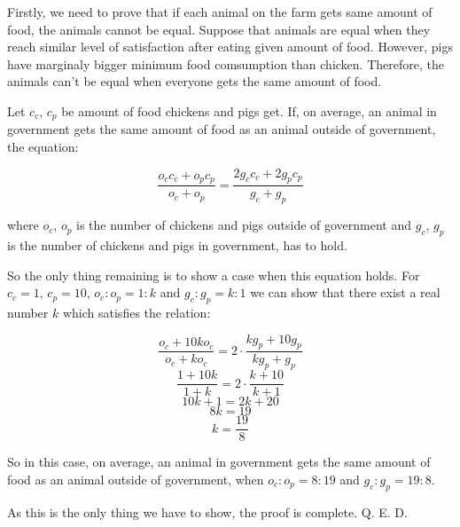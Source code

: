 \documentclass{fkssolpub}
\author{Ondřej Sedláček}
\begin{document}
Firstly, we need to prove that if each animal on the farm gets same
amount of food, the animals cannot be equal. Suppose that animals are
equal when they reach similar level of satisfaction after eating given
amount of food. However, pigs have marginaly bigger minimum food comsumption
than chicken. Therefore, the animals can't be equal when everyone gets the
same amount of food.

Let $c_c$, $c_p$ be amount of food chickens and pigs get. If, on average,
an animal in government gets the same amount of food as an animal outside
of government, the equation:

\[
	\frac{o_c c_c + o_p c_p}{o_c + o_p} = \frac{2 g_c c_c + 2 g_p c_p}{g_c + g_p}
\]

where $o_c$, $o_p$ is the number of chickens and pigs outside of government and
$g_c$, $g_p$ is the number of chickens and pigs in government, has to hold.

So the only thing remaining is to show a case when this equation holds. For
$c_c = 1$, $c_p = 10$, $o_c : o_p = 1 : k$ and $g_c : g_p = k : 1$ we can
show that there exist a real number $k$ which satisfies the relation:

\[
	\frac{o_c + 10 k o_c}{o_c + k o_c} = 2 \cdot \frac{k g_p + 10 g_p}{k g_p + g_p}
\]
\[
	\frac{1 + 10 k}{1 + k} = 2 \cdot \frac{k + 10}{k + 1}
\]
\[
	10k + 1 = 2k + 20
\]
\[
	8k = 19
\]
\[
	k = \frac{19}{8}
\]

So in this case, on average, an animal in government gets the same amount of food as
an animal outside of government, when $o_c : o_p = 8 : 19$ and $g_c : g_p = 19 : 8$.

As this is the only thing we have to show, the proof is complete. Q. E. D.
\end{document}
